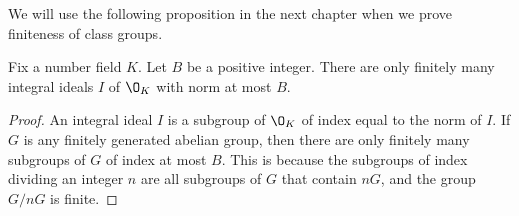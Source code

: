 We will use the following proposition in the next chapter when
we prove finiteness of class groups.
\begin{proposition}\label{prop:finitewithnorm}%
Fix a number field $K$.
Let $B$ be a positive integer.  There
are only finitely many integral ideals
$I$ of $\O_K$ with norm at most $B$.
\end{proposition}
\begin{proof}
An integral ideal $I$ is a subgroup of $\O_K$ of index equal to the
norm of $I$.  If $G$ is any finitely generated abelian group, then
there are only finitely many subgroups of $G$ of index at most $B$.
This is because the subgroups of index dividing an integer $n$ are all subgroups
of $G$ that contain $nG$, and the group $G/nG$ is finite.
\end{proof}

